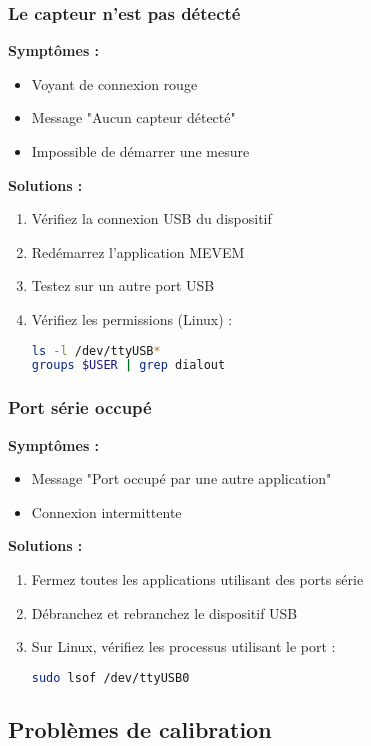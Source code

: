 \documentclass[12pt,a4paper]{article}
\begin{document}
\subsubsection{Le capteur n'est pas détecté}

\textbf{Symptômes :}
\begin{itemize}
    \item Voyant de connexion rouge
    \item Message "Aucun capteur détecté"
    \item Impossible de démarrer une mesure
\end{itemize}

\textbf{Solutions :}
\begin{enumerate}
    \item Vérifiez la connexion USB du dispositif
    \item Redémarrez l'application MEVEM
    \item Testez sur un autre port USB
    \item Vérifiez les permissions (Linux) :
    \begin{lstlisting}[language=bash]
ls -l /dev/ttyUSB*
groups $USER | grep dialout
    \end{lstlisting}
\end{enumerate}

\subsubsection{Port série occupé}

\textbf{Symptômes :}
\begin{itemize}
    \item Message "Port occupé par une autre application"
    \item Connexion intermittente
\end{itemize}

\textbf{Solutions :}
\begin{enumerate}
    \item Fermez toutes les applications utilisant des ports série
    \item Débranchez et rebranchez le dispositif USB
    \item Sur Linux, vérifiez les processus utilisant le port :
    \begin{lstlisting}[language=bash]
sudo lsof /dev/ttyUSB0
    \end{lstlisting}
\end{enumerate}

\subsection{Problèmes de calibration}
\end{document}
